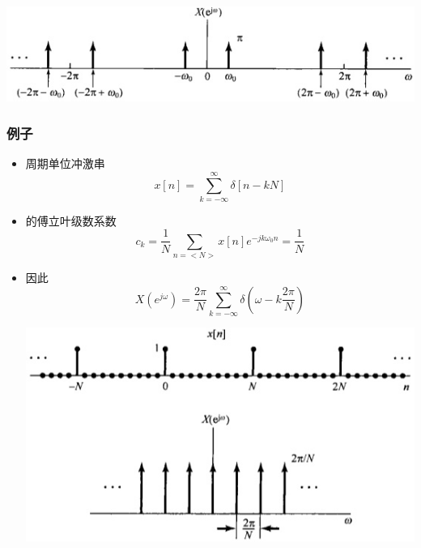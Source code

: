 \documentclass[CJKutf8,xcolor=pdftex,dvipsnames,table]{beamer}
\begin{document}
\begin{CJK*}{UTF8}{song}
\begin{frame}
\begin{itemize}
    	\begin{center}
    	\includegraphics[scale=.5]{ss-c-f5-10}
    	\end{center}
    \end{itemize}

  \end{frame}    
  
  \begin{frame}
    \frametitle{例子}
    \begin{itemize}
    \item 周期单位冲激串
    \[
	    x[n]=\sum_{k=-\infty}^{\infty}\delta[n-kN]
    \]
    \item 的傅立叶级数系数
    \[
    	c_k=\frac{1}{N}\sum_{n=<N>}x[n]e^{-jk\omega_0 n}=\frac{1}{N}
    \]
	\item 因此
        \[
 			X(e^{j\omega}) = \frac{2\pi}{N}\sum_{k=-\infty}^{\infty}\delta(\omega - k\frac{2\pi}{N})   
    	\]	
	
    	\begin{center}
    	\includegraphics[scale=.35]{ss-c-f5-11}
    	\end{center}
    \end{itemize}

  \end{frame}    
    

\end{CJK*}
\end{document}
